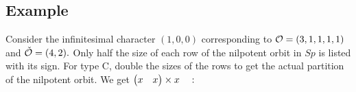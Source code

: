 \documentclass[11pt ,reqno]{amsart}
\begin{document}
\begin{comment}
Continue this way down the rows of $\tau_L$.

When sizes of pairs of rows are repeated, form the nilpotent orbit
from $\tau_L\times \tau_R$ with the duplicate pairs of rows
ending in $\bullet$ and $r/c$ removed, and then add the pairs of equal
rows as in the case $\tau_L=\tau_R$.

\end{comment}

\newpage
\subsection{Example}\label{3.5} Consider the infinitesimal character $(1,0,0)$
corresponding to $\mathcal O=(3,1,1,1,1)$ and ${\check {\mathcal O}}=(4,2).$ Only half the
size of each row of the nilpotent
orbit in $Sp$ is listed with its sign. {\clrr For type C, double the sizes of
the rows to get the actual partition of the nilpotent orbit}. We get
$\begin{pmatrix}  x&x\end{pmatrix}\times \begin{matrix}  x&\end{matrix}:$ 
\end{document}
